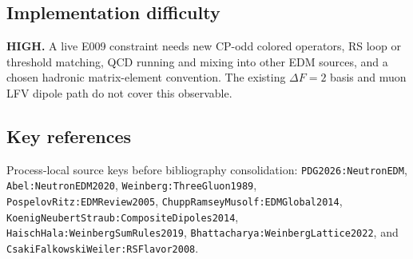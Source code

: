 \subsection*{Implementation difficulty}
\textbf{HIGH.}  A live E009 constraint needs new CP-odd colored operators,
RS loop or threshold matching, QCD running and mixing into other EDM sources,
and a chosen hadronic matrix-element convention.  The existing \(\Delta F=2\)
basis and muon LFV dipole path do not cover this observable.

\subsection*{Key references}
Process-local source keys before bibliography consolidation:
\texttt{PDG2026:NeutronEDM}, \texttt{Abel:NeutronEDM2020},
\texttt{Weinberg:ThreeGluon1989}, \texttt{PospelovRitz:EDMReview2005},
\texttt{ChuppRamseyMusolf:EDMGlobal2014},
\texttt{KoenigNeubertStraub:CompositeDipoles2014},
\texttt{HaischHala:WeinbergSumRules2019},
\texttt{Bhattacharya:WeinbergLattice2022}, and
\texttt{CsakiFalkowskiWeiler:RSFlavor2008}.
